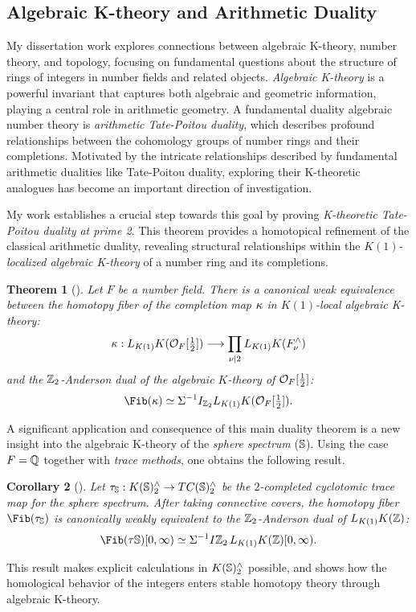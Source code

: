 \documentclass[11pt]{article}
\newtheorem{theorem}{Theorem}
\newtheorem{corollary}[theorem]{Corollary}
\begin{document}
\subsection{Algebraic K-theory and Arithmetic Duality}
My dissertation work explores connections between algebraic K-theory, number theory, and topology, focusing on fundamental questions about the structure of rings of integers in number fields and related objects. {\it Algebraic K-theory} is a powerful invariant that captures both algebraic and geometric information, playing a central role in arithmetic geometry. A fundamental duality algebraic number theory is {\it arithmetic Tate-Poitou duality}, which describes profound relationships between the cohomology groups of number rings and their completions. Motivated by the intricate relationships described by fundamental arithmetic dualities like Tate-Poitou duality, exploring their K-theoretic analogues has become an important direction of investigation.

My work establishes a crucial step towards this goal by proving {\it K-theoretic Tate-Poitou duality at prime 2}. This theorem provides a homotopical refinement of the classical arithmetic duality, revealing structural relationships within the {\it $K(1)$-localized algebraic K-theory} of a number ring and its completions.
\begin{theorem}[\cite{Cho}]
Let $F$ be a number field.
There is a canonical weak equivalence between  the {\it homotopy fiber of the completion map} $\kappa$ in $K(1)$-local algebraic K-theory:
\[\kappa: L_{K(1)}K({\mathcal{O}}_F[\tfrac{1}{2}]) \longrightarrow \prod_{\nu \mid 2} L_{K(1)}K(F_\nu^\wedge)\]
and the $\mathbb{Z}_2$-Anderson dual of the algebraic $K$-theory of ${\mathcal{O}}_F[\tfrac{1}{2}]$:
 \begin{equation}\label{fib}
 \Fib(\ka) \simeq \SI^{-1} I_{\bZ_2} L_{K(1)}K(\calO_F[\tfrac{1}{2}]).
\end{equation}
\end{theorem}

A significant application and consequence of this main duality theorem is a new insight into the algebraic K-theory of the {\it sphere spectrum} ($\mathbb{S}$).
Using the case $F=\mathbb{Q}$ together with {\it trace methods}, one obtains the following result.
\begin{corollary}[\cite{Cho}]
Let $\tau_{\mathbb{S}}: K(\mathbb{S})_2^\wedge \to TC(\mathbb{S})_2^\wedge$ be the $2$-completed cyclotomic trace map for the sphere spectrum.
After taking connective covers, the homotopy fiber $\Fib(\ta_\bS)$ is canonically weakly equivalent to the $\mathbb{Z}_2$-Anderson dual of $L_{K(1)}K(\mathbb{Z})$:
\[\Fib(\ta\bS)[0,\infty) \simeq \Sigma^{-1} I{\bZ_2}\, L_{K(1)}K(\bZ)[0,\infty).\]
\end{corollary}
This result makes explicit calculations in $K(\mathbb{S})_2^\wedge$ possible, and shows how the homological behavior of the integers enters stable homotopy theory through algebraic K-theory.
\end{document}

